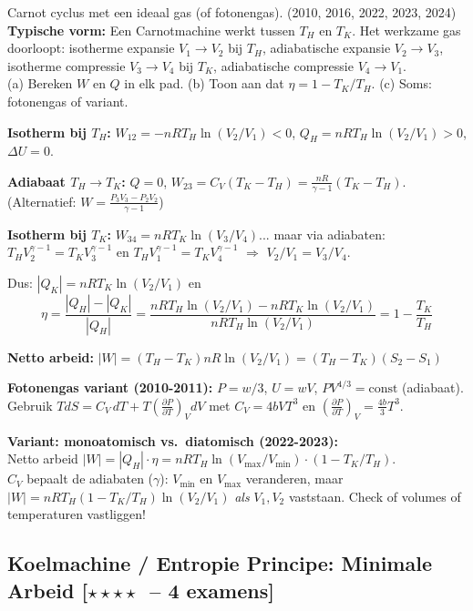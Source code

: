 \documentclass[10pt,a4paper]{article}
\newcommand{\pder}[2]{\left(\frac{\partial #1}{\partial #2}\right)}
\begin{document}
\begin{oefening}{Carnot cyclus met een ideaal gas (of fotonengas). \textnormal{(2010, 2016, 2022, 2023, 2024)}}
\textbf{Typische vorm:} Een Carnotmachine werkt tussen $T_H$ en $T_K$. Het werkzame gas doorloopt: isotherme expansie $V_1 \to V_2$ bij $T_H$, adiabatische expansie $V_2 \to V_3$, isotherme compressie $V_3 \to V_4$ bij $T_K$, adiabatische compressie $V_4 \to V_1$.\\
(a) Bereken $W$ en $Q$ in elk pad. (b) Toon aan dat $\eta = 1 - T_K/T_H$. (c) Soms: fotonengas of variant.
\end{oefening}

\begin{oplossing}
\textbf{Isotherm bij $T_H$:} $W_{12} = -nRT_H\ln(V_2/V_1) < 0$,\; $Q_H = nRT_H\ln(V_2/V_1) > 0$,\; $\Delta U = 0$.

\textbf{Adiabaat $T_H \to T_K$:} $Q=0$,\; $W_{23} = C_V(T_K-T_H) = \frac{nR}{\gamma-1}(T_K-T_H)$. (Alternatief: $W = \frac{P_3V_3 - P_2V_2}{\gamma-1}$)

\textbf{Isotherm bij $T_K$:} $W_{34} = nRT_K\ln(V_3/V_4)$... maar via adiabaten: $T_HV_2^{\gamma-1} = T_KV_3^{\gamma-1}$ en $T_HV_1^{\gamma-1} = T_KV_4^{\gamma-1}$ $\Rightarrow$ $V_2/V_1 = V_3/V_4$.

Dus: $|Q_K| = nRT_K\ln(V_2/V_1)$ en
$$\eta = \frac{|Q_H| - |Q_K|}{|Q_H|} = \frac{nRT_H\ln(V_2/V_1) - nRT_K\ln(V_2/V_1)}{nRT_H\ln(V_2/V_1)} = 1 - \frac{T_K}{T_H}$$

\textbf{Netto arbeid:} $|W| = (T_H - T_K)nR\ln(V_2/V_1) = (T_H-T_K)(S_2-S_1)$

\textbf{Fotonengas variant (2010-2011):} $P = w/3$, $U = wV$, $PV^{4/3} = \text{const}$ (adiabaat). Gebruik $TdS = C_V\,dT + T\pder{P}{T}_V dV$ met $C_V = 4bVT^3$ en $\pder{P}{T}_V = \frac{4b}{3}T^3$.

\textbf{Variant: monoatomisch vs.\ diatomisch (2022-2023):}\\
Netto arbeid $|W| = |Q_H|\cdot\eta = nRT_H\ln(V_\text{max}/V_\text{min})\cdot(1-T_K/T_H)$.\\
$C_V$ bepaalt de adiabaten ($\gamma$): $V_\text{min}$ en $V_\text{max}$ veranderen, maar $|W| = nRT_H(1-T_K/T_H)\ln(V_2/V_1)$ {\em als}  $V_1, V_2$ vaststaan. Check of volumes of temperaturen vastliggen!
\end{oplossing}

\subsection{Koelmachine / Entropie Principe: Minimale Arbeid \textnormal{\color{warningred}[$\star\star\star\star$\ -- 4 examens]}}
\end{document}
